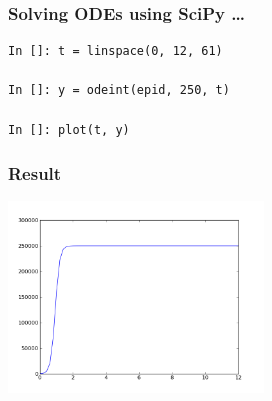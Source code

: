 \documentclass[14pt,compress]{beamer}
\begin{document}
\begin{frame}[fragile]
\frametitle{Solving ODEs using SciPy \ldots}
\begin{lstlisting}
In []: t = linspace(0, 12, 61)

In []: y = odeint(epid, 250, t)

In []: plot(t, y)
\end{lstlisting}
\end{frame}

\begin{frame}[fragile]
\frametitle{Result}
\begin{center}
    \includegraphics[height=2in, interpolate=true]{images/population_ode}
\end{center}
\end{frame}
\end{document}
